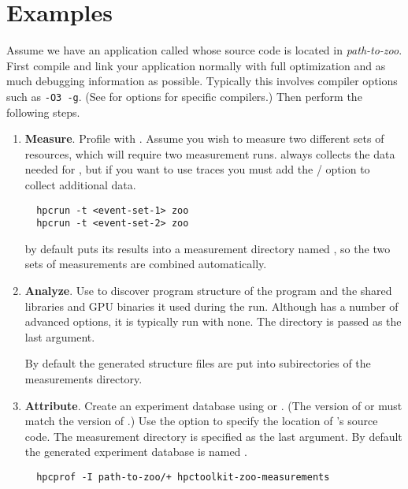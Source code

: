 \documentclass[english]{article}
\begin{document}
\section{Examples}

Assume we have an application called  whose source code is located in \emph{path-to-zoo}.
First compile and link your application normally with full optimization
and as much debugging information as possible.
Typically this involves compiler options such as \verb+-O3 -g+.
(See  for options for specific compilers.)
Then perform the following steps.

\begin{enumerate}

\item \textbf{Measure}.
Profile with .
Assume you wish to measure two different sets of resources,
which will require two measurement runs.
 always collects the data needed for ,
but if you want to use traces you must add
the  /  option to collect additional data.
\begin{verbatim}
  hpcrun -t <event-set-1> zoo
  hpcrun -t <event-set-2> zoo
\end{verbatim}

 by default puts its results into a measurement directory
named ,
so the two sets of measurements are combined automatically.

\item \textbf{Analyze}. 
Use  to discover program structure of the program
and the shared libraries and GPU binaries it used during the run.
Although  has a number of advanced options, it is typically run with none.
The   directory is passed as the last argument.

By default the generated structure files are put into subirectories of the measurements directory.

\item \textbf{Attribute}.
Create an experiment database using 
or .
(The version of 
or  must match
the version of .)
Use the  option to specify the location of 's source code.
The measurement directory is specified as the last argument.
By default the generated experiment database is named .
\begin{verbatim}
  hpcprof -I path-to-zoo/+ hpctoolkit-zoo-measurements
\end{verbatim}


\end{enumerate}
\end{document}
